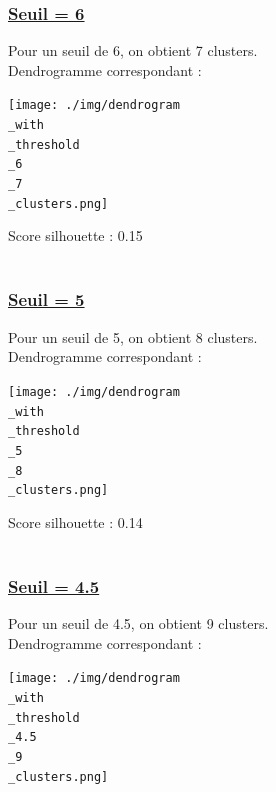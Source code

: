 \documentclass{article}
\begin{document}
\subsubsection*{\underline{Seuil = 6}}
Pour un seuil de 6, on obtient 7 clusters.\\
Dendrogramme correspondant :

\begin{center}
    \texttt{[image: ./img/dendrogram\\\_with\\\_threshold\\\_6\\\_7\\\_clusters.png]}
\end{center}

\noindent Score silhouette : 0.15\\\\

\subsubsection*{\underline{Seuil = 5}}
Pour un seuil de 5, on obtient 8 clusters.\\
Dendrogramme correspondant :

\begin{center}
    \texttt{[image: ./img/dendrogram\\\_with\\\_threshold\\\_5\\\_8\\\_clusters.png]}
\end{center}

\noindent Score silhouette : 0.14\\\\

\subsubsection*{\underline{Seuil = 4.5}}
Pour un seuil de 4.5, on obtient 9 clusters.\\
Dendrogramme correspondant :

\begin{center}
    \texttt{[image: ./img/dendrogram\\\_with\\\_threshold\\\_4.5\\\_9\\\_clusters.png]}
\end{center}
\end{document}
